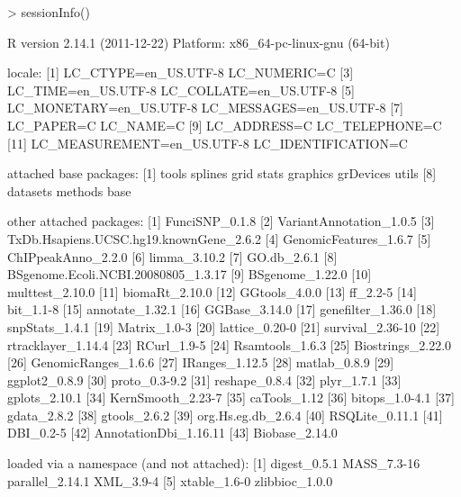 \documentclass[a4paper]{article}
\begin{document}
\begin{Schunk}
\begin{Sinput}
> sessionInfo()
\end{Sinput}
\begin{Soutput}
R version 2.14.1 (2011-12-22)
Platform: x86_64-pc-linux-gnu (64-bit)

locale:
 [1] LC_CTYPE=en_US.UTF-8       LC_NUMERIC=C              
 [3] LC_TIME=en_US.UTF-8        LC_COLLATE=en_US.UTF-8    
 [5] LC_MONETARY=en_US.UTF-8    LC_MESSAGES=en_US.UTF-8   
 [7] LC_PAPER=C                 LC_NAME=C                 
 [9] LC_ADDRESS=C               LC_TELEPHONE=C            
[11] LC_MEASUREMENT=en_US.UTF-8 LC_IDENTIFICATION=C       

attached base packages:
 [1] tools     splines   grid      stats     graphics  grDevices utils    
 [8] datasets  methods   base     

other attached packages:
 [1] FunciSNP_0.1.8                         
 [2] VariantAnnotation_1.0.5                
 [3] TxDb.Hsapiens.UCSC.hg19.knownGene_2.6.2
 [4] GenomicFeatures_1.6.7                  
 [5] ChIPpeakAnno_2.2.0                     
 [6] limma_3.10.2                           
 [7] GO.db_2.6.1                            
 [8] BSgenome.Ecoli.NCBI.20080805_1.3.17    
 [9] BSgenome_1.22.0                        
[10] multtest_2.10.0                        
[11] biomaRt_2.10.0                         
[12] GGtools_4.0.0                          
[13] ff_2.2-5                               
[14] bit_1.1-8                              
[15] annotate_1.32.1                        
[16] GGBase_3.14.0                          
[17] genefilter_1.36.0                      
[18] snpStats_1.4.1                         
[19] Matrix_1.0-3                           
[20] lattice_0.20-0                         
[21] survival_2.36-10                       
[22] rtracklayer_1.14.4                     
[23] RCurl_1.9-5                            
[24] Rsamtools_1.6.3                        
[25] Biostrings_2.22.0                      
[26] GenomicRanges_1.6.6                    
[27] IRanges_1.12.5                         
[28] matlab_0.8.9                           
[29] ggplot2_0.8.9                          
[30] proto_0.3-9.2                          
[31] reshape_0.8.4                          
[32] plyr_1.7.1                             
[33] gplots_2.10.1                          
[34] KernSmooth_2.23-7                      
[35] caTools_1.12                           
[36] bitops_1.0-4.1                         
[37] gdata_2.8.2                            
[38] gtools_2.6.2                           
[39] org.Hs.eg.db_2.6.4                     
[40] RSQLite_0.11.1                         
[41] DBI_0.2-5                              
[42] AnnotationDbi_1.16.11                  
[43] Biobase_2.14.0                         

loaded via a namespace (and not attached):
[1] digest_0.5.1    MASS_7.3-16     parallel_2.14.1 XML_3.9-4      
[5] xtable_1.6-0    zlibbioc_1.0.0 
\end{Soutput}
\end{Schunk}
\end{document}
